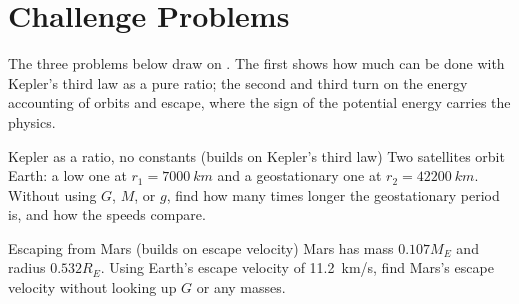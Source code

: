 \section{Challenge Problems}\label{sec:challenge17}
The three problems below draw on . The first shows how much can be done with Kepler's
third law as a pure ratio; the second and third turn on the energy accounting of orbits and escape, where the
sign of the potential energy carries the physics.

\begin{challengebox}{Kepler as a ratio, no constants (builds on Kepler's third law)}
Two satellites orbit Earth: a low one at $r_1=\SI{7000}{km}$ and a geostationary one at
$r_2=\SI{42200}{km}$. Without using $G$, $M$, or $g$, find how many times longer the geostationary
period is, and how the speeds compare.
\end{challengebox}

\begin{challengebox}{Escaping from Mars (builds on escape velocity)}
Mars has mass $0.107 M_E$ and radius $0.532 R_E$. Using Earth's escape velocity of \SI{11.2}{km/s}, find
Mars's escape velocity without looking up $G$ or any masses.
\end{challengebox}

